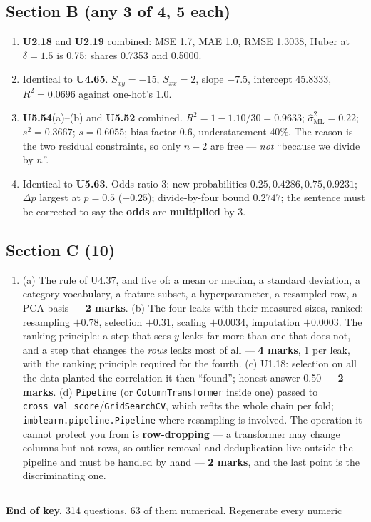 \documentclass[11pt,a4paper]{article}
\begin{document}
\subsection*{Section B (any 3 of 4, 5 each)}
\begin{enumerate}[label=\textbf{\arabic*.}, leftmargin=*, start=6]
\item \textbf{U2.18} and \textbf{U2.19} combined: MSE 1.7, MAE 1.0,
  RMSE 1.3038, Huber at $\delta=1.5$ is 0.75; shares 0.7353 and 0.5000.
\item Identical to \textbf{U4.65}. $S_{xy} = -15$, $S_{xx} = 2$, slope $-7.5$,
  intercept 45.8333, $R^2 = 0.0696$ against one-hot's 1.0.
\item \textbf{U5.54}(a)--(b) and \textbf{U5.52} combined. $R^2 = 1 - 1.10/30 = 0.9633$;
  $\hat\sigma^2_{\text{ML}} = 0.22$; $s^2 = 0.3667$; $s = 0.6055$;
  bias factor $0.6$, understatement $40\%$. The reason is the two residual
  constraints, so only $n-2$ are free --- \emph{not} ``because we divide by
  $n$''.
\item Identical to \textbf{U5.63}. Odds ratio 3; new probabilities
  $0.25, 0.4286, 0.75, 0.9231$; $\Delta p$ largest at $p = 0.5$ ($+0.25$);
  divide-by-four bound $0.2747$; the sentence must be corrected to say the
  \textbf{odds} are \textbf{multiplied} by 3.
\end{enumerate}

\subsection*{Section C (10)}
\begin{enumerate}[label=\textbf{\arabic*.}, leftmargin=*, start=10]
\item (a) The rule of U4.37, and five of: a mean or median, a standard
  deviation, a category vocabulary, a feature subset, a hyperparameter, a
  resampled row, a PCA basis --- \textbf{2 marks}.
  (b) The four leaks with their measured sizes, ranked: resampling $+0.78$,
  selection $+0.31$, scaling $+0.0034$, imputation $+0.0003$. The ranking
  principle: a step that sees $y$ leaks far more than one that does not, and a
  step that changes the \emph{rows} leaks most of all --- \textbf{4 marks},
  1 per leak, with the ranking principle required for the fourth.
  (c) U1.18: selection on all the data planted the correlation it then
  ``found''; honest answer 0.50 --- \textbf{2 marks}.
  (d) \texttt{Pipeline} (or \texttt{ColumnTransformer} inside one) passed to
  \texttt{cross\_val\_score}/\texttt{GridSearchCV}, which refits the whole chain
  per fold; \texttt{imblearn.pipeline.Pipeline} where resampling is involved.
  The operation it cannot protect you from is \textbf{row-dropping} --- a
  transformer may change columns but not rows, so outlier removal and
  deduplication live outside the pipeline and must be handled by hand
  --- \textbf{2 marks}, and the last point is the discriminating one.
\end{enumerate}

\vspace{0.6em}\hrule\vspace{0.4em}
\noindent\small\textbf{End of key.} 314 questions, 63 of them numerical. Regenerate every numeric
\end{document}
